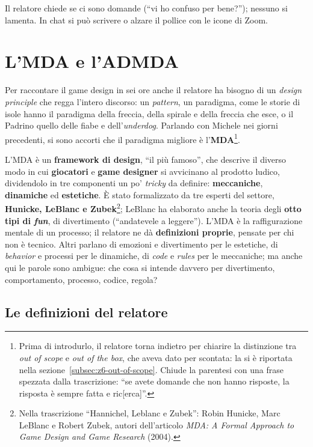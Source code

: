 Il relatore chiede se ci sono domande (``vi ho confuso per bene?''); nessuno si
lamenta. In chat si può scrivere o alzare il pollice con le icone di Zoom.

\section{L'MDA e l'ADMDA}
\label{sec:z6-mda}

Per raccontare il game design in sei ore anche il relatore ha bisogno di un
\emph{design principle} che regga l'intero discorso: un \emph{pattern}, un
paradigma, come le storie di isole hanno il paradigma della freccia, della
spirale e della freccia che esce, o il Padrino quello delle fiabe e
dell'\emph{underdog}. Parlando con Michele nei giorni precedenti, si sono accorti
che il paradigma migliore è l'\textbf{MDA}\footnote{Prima di introdurlo, il
relatore torna indietro per chiarire la distinzione tra \emph{out of scope} e
\emph{out of the box}, che aveva dato per scontata: la si è riportata nella
sezione~\ref{subsec:z6-out-of-scope}. Chiude la parentesi con una frase spezzata
dalla trascrizione: ``se avete domande che non hanno risposte, la risposta è
sempre fatta e ric[erca]''.}.

L'MDA è un \textbf{framework di design}, ``il più famoso'', che descrive il
diverso modo in cui \textbf{giocatori} e \textbf{game designer} si avvicinano al
prodotto ludico, dividendolo in tre componenti un po' \emph{tricky} da
definire: \textbf{meccaniche}, \textbf{dinamiche} ed \textbf{estetiche}. È stato
formalizzato da tre esperti del settore, \textbf{Hunicke, LeBlanc e
Zubek}\footnote{Nella trascrizione ``Hannichel, Leblanc e Zubek'': Robin Hunicke,
Marc LeBlanc e Robert Zubek, autori dell'articolo \emph{MDA: A Formal Approach to
Game Design and Game Research} (2004).}; LeBlanc ha elaborato anche la teoria
degli \textbf{otto tipi di \emph{fun}}, di divertimento (``andatevele a
leggere''). L'MDA è la raffigurazione mentale di un processo; il relatore ne dà
\textbf{definizioni proprie}, pensate per chi non è tecnico. Altri parlano di
emozioni e divertimento per le estetiche, di \emph{behavior} e processi per le
dinamiche, di \emph{code} e \emph{rules} per le meccaniche; ma anche qui le
parole sono ambigue: che cosa si intende davvero per divertimento,
comportamento, processo, codice, regola?

\subsection{Le definizioni del relatore}

